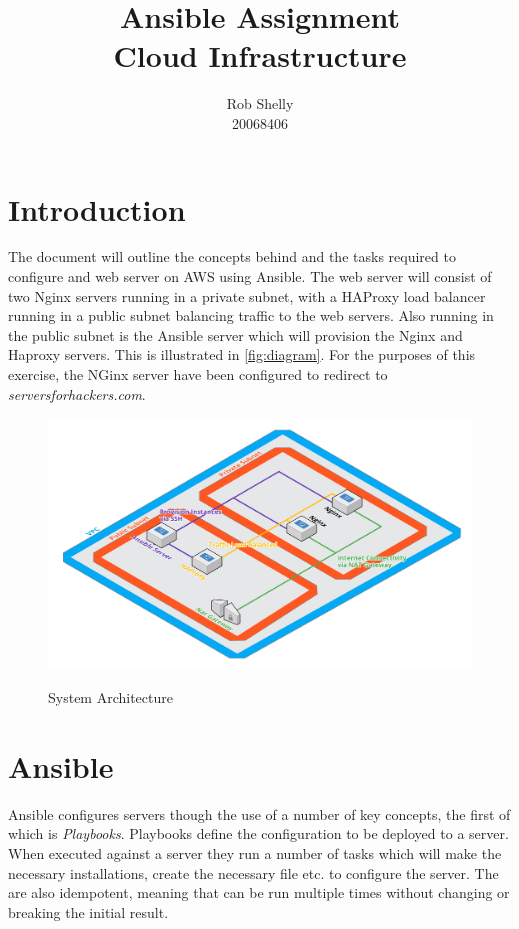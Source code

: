 \documentclass[a4paper]{article}
\title{Ansible Assignment \\ \small{Cloud Infrastructure}}
\author{Rob Shelly \\ \small{20068406}}
\begin{document}
	
	\maketitle
	
	\newpage
	\tableofcontents
	
	\newpage
	\section{Introduction}
    The document will outline the concepts behind and the tasks required to configure and web server on AWS using Ansible. The web server will consist of two Nginx servers running in a private subnet, with a HAProxy load balancer running in a public subnet balancing traffic to the web servers. Also running in the public subnet is the Ansible server which will provision the Nginx and Haproxy servers. This is illustrated in \autoref{fig:diagram}. For the purposes of this exercise, the NGinx server have been configured to redirect to \textit{serversforhackers.com}.
    
    \begin{figure}[H]
      \caption{System Architecture}
      \centering
      \includegraphics[width=\textwidth,height=\textheight,keepaspectratio]{diagram1}
      \label{fig:diagram}
    \end{figure}
    
  \section{Ansible}
    Ansible configures servers though the use of a number of key concepts, the first of which is \textit{Playbooks}. Playbooks define the configuration to be deployed to a server. When executed against a server they run a number of tasks which will make the necessary installations, create the necessary file etc. to configure the server. The are also idempotent, meaning that can be run multiple times without changing or breaking the initial result.
    
\end{document}
